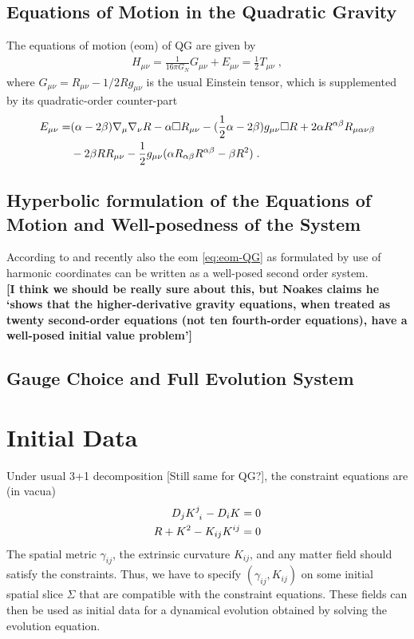 \documentclass[a4paper,oneside,openany,11pt]{memoir}
\numberwithin{equation}{section} %
\newcommand{\aaron}[1]{{\color{OliveGreen} #1}}
\newcommand{\NOTE}[1]{{\color{blue}[#1]}}
\begin{document}
\subsection{Equations of Motion in the Quadratic Gravity}

The equations of motion (eom) of QG are given by
\begin{align}
\label{eq:eom-QG}
	H_{\mu\nu}=\frac{1}{16 \pi G_N} G_{\mu\nu} + E_{\mu\nu}=\frac{1}{2}T_{\mu\nu}\;,
\end{align}
where $G_{\mu\nu} = R_{\mu\nu} -1/2 R g_{\mu\nu}$ is the usual Einstein tensor, which is supplemented by its quadratic-order counter-part
\begin{align}
	E_{\mu\nu} = &(\alpha-2\beta)\nabla_\mu\nabla_\nu R-\alpha \square R_{\mu\nu}-(\frac{1}{2}\alpha-2\beta)g_{\mu\nu}\square R
+2\alpha R^{\alpha\beta}R_{\mu\alpha\nu\beta}
	\notag\\
	&-2\beta R R_{\mu\nu}-\frac{1}{2}g_{\mu\nu}(\alpha R_{\alpha\beta}R^{\alpha\beta}-\beta R^2)\;.
\end{align}

\subsection{Hyperbolic formulation of the Equations of Motion and Well-posedness of the System}

According to \cite{Noakes:1983} and recently also \cite{Morales:2018imi} the eom \eqref{eq:eom-QG} as formulated by use of harmonic coordinates can be written as a well-posed second order system.
\\
\aaron{\textbf{[I think we should be really sure about this, but Noakes claims he `shows that the higher-derivative gravity equations, when treated as twenty second-order equations (not ten fourth-order equations), have a well-posed initial value problem']}}

\subsection{Gauge Choice and Full Evolution System}

\section{Initial Data}
Under usual 3+1 decomposition \NOTE{Still same for QG?}, the constraint equations are (in vacua)
\begin{align}
D_j K\indices{^j_i} - D_i K &= 0 \\
R + K^2 - K_{ij} K^{ij} &= 0
\end{align}
The spatial metric $\gamma_{ij}$, the extrinsic curvature $K_{ij}$, and any matter field should 
satisfy the constraints. Thus, we have to specify $(\gamma_{ij}, K_{ij})$ on some initial 
spatial slice $\Sigma$ that are compatible with the constraint equations. These fields can 
then be used as initial data for a dynamical evolution obtained by solving the evolution equation.
\end{document}
